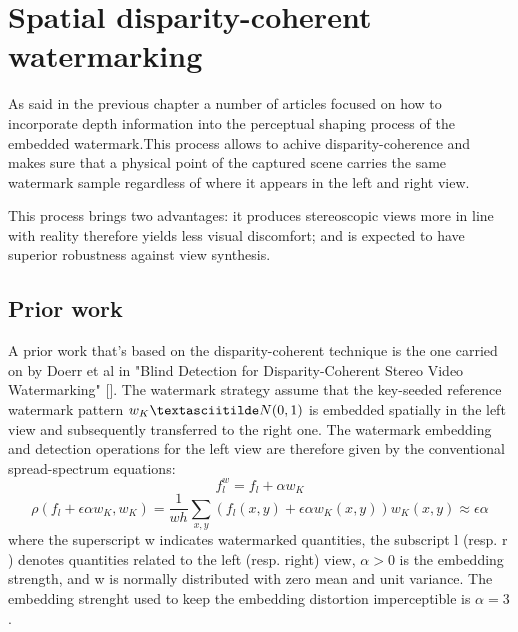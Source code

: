 \chapter{Spatial disparity-coherent watermarking}
\label{spa}



As said in the previous chapter a number of articles focused on how to incorporate depth information into the perceptual shaping process of the embedded watermark.\newline This process allows to achive disparity-coherence and makes sure that a physical point of the captured scene carries the same watermark sample regardless of where it appears in the left and right view.\newline

This process brings two advantages: it produces stereoscopic views more in line with reality therefore yields less visual discomfort; and is expected to have superior robustness against view synthesis.\newline

\section{Prior work} 

A prior work that's based on the disparity-coherent technique is the one carried on by Doerr et al in "Blind Detection for Disparity-Coherent
Stereo Video Watermarking" [].\newline
The watermark strategy  assume that the key-seeded reference watermark pattern $w_{K}\textasciitilde N(0, 1)$ is embedded spatially in the left view and subsequently transferred to the right one.\newline
The watermark embedding and detection operations for the left view are therefore given by the conventional spread-spectrum equations:\newline
$$f_{l}^{w} = f_{l}+\alpha w_{K}$$
$$\rho(f_{l}+\epsilon\alpha w_{K},w_{K})= \frac{1}{wh}\sum_{x,y}(f_{l}(x,y)+\epsilon\alpha w_{K}(x,y))w_{K}(x,y)\approx\epsilon\alpha $$
where the superscript w indicates watermarked quantities, the subscript l (resp. r ) denotes quantities related to the left (resp. right) view, $\alpha > 0$ is the embedding strength, and w is normally distributed with zero mean and unit variance.\newline
The embedding strenght used to keep the embedding distortion imperceptible is $\alpha = 3$.\newline 

